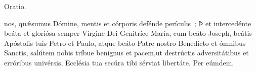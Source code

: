 {\color{rougeliturgique}Oratio.}\par

\vspace{0.5cm}

 nos, quǽsumus Dómine, mentis et córporis defénde perículis~; Þ et intercedénte beáta et gloriósa semper Vírgine Dei Genitríce María, cum beáto Joseph, beátis Apóstolis tuis Petro et Paulo, atque beáto Patre nostro Benedícto et ómnibus Sanctis, salútem nobis tríbue benígnus et pacem,\GreStarNbsp ut destrúctis adversitátibus et erróribus univérsis, Ecclésia tua secúra tibi sérviat libertáte. Per eúmdem.







